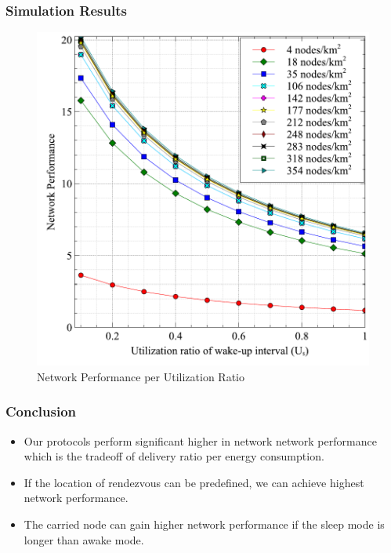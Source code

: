 \documentclass{beamer}
\begin{document}
\begin{frame}
	\frametitle{Simulation Results}
\begin{figure}
\centering
\includegraphics[width=0.6\linewidth]{Figures_Present/Utilization}
\caption{Network Performance per Utilization Ratio}
\label{fig:Utilization}
\end{figure}
\end{frame}
\begin{frame}
	\frametitle{Conclusion}
\begin{itemize}
	\item Our protocols perform significant higher in network network performance which is the tradeoff of delivery ratio per energy consumption. 
	\item If the location of rendezvous can be predefined, we can achieve highest network performance. 
	\item The carried node can gain higher network performance if the sleep mode is longer than awake mode.
\end{itemize}
\end{frame}
\end{document}
